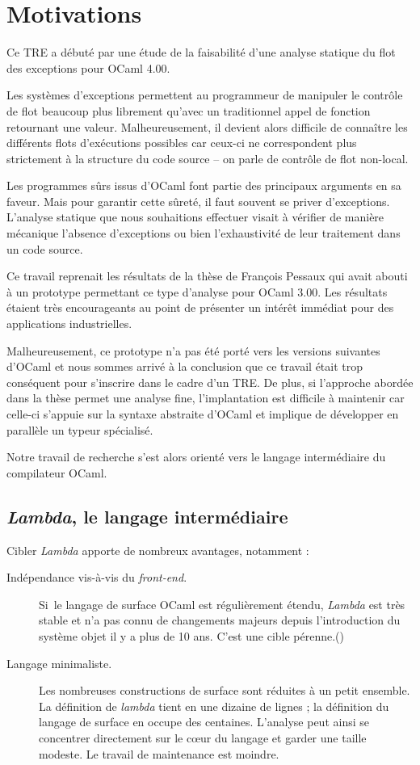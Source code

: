 \chapter{Motivations}

Ce TRE a débuté par une étude de la faisabilité d'une analyse statique du
flot des exceptions pour OCaml 4.00. 

Les systèmes d'exceptions permettent au programmeur de manipuler le contrôle de
flot beaucoup plus librement qu'avec un traditionnel appel de fonction
retournant une valeur. Malheureusement, il devient alors difficile de connaître
les différents flots d'exécutions possibles car ceux-ci ne correspondent plus
strictement à la structure du code source -- on parle de contrôle de flot
non-local.

Les programmes sûrs issus d'OCaml font partie des principaux arguments en sa
faveur. Mais pour garantir cette sûreté, il faut souvent se priver
d'exceptions.  L'analyse statique que nous souhaitions effectuer visait à
vérifier de manière mécanique l'absence d'exceptions ou bien l'exhaustivité de
leur traitement dans un code source.

Ce travail reprenait les résultats de la thèse de François Pessaux
\cite{ExcAnalysis} qui avait abouti à un prototype permettant ce type d'analyse
pour OCaml 3.00.  Les résultats étaient très encourageants au point de
présenter un intérêt immédiat pour des applications industrielles.

Malheureusement, ce prototype n'a pas été porté vers les versions suivantes
d'OCaml et nous sommes arrivé à la conclusion que ce travail était trop
conséquent pour s'inscrire dans le cadre d'un TRE.  De plus, si l'approche
abordée dans la thèse permet une analyse fine, l'implantation est difficile à
maintenir car celle-ci s'appuie sur la syntaxe abstraite d'OCaml et implique de
développer en parallèle un typeur spécialisé.

Notre travail de recherche s'est alors orienté vers le langage intermédiaire du
compilateur OCaml. 

\section{\emph{Lambda}, le langage intermédiaire}

Cibler \emph{Lambda} apporte de nombreux avantages, notamment :
\begin{description}
  \item[Indépendance vis-à-vis du \emph{front-end}.] Si le langage de surface
    OCaml est régulièrement étendu, \emph{Lambda} est très stable et n'a pas
    connu de changements majeurs depuis l'introduction du système objet il y a
    plus de 10 ans. C'est une cible pérenne.()
  \item[Langage minimaliste.]
    Les nombreuses constructions de surface sont réduites à un petit ensemble.
		La définition de \emph{lambda} tient en une dizaine de lignes ;
		la définition du langage de surface en occupe des centaines.
    L'analyse peut ainsi se concentrer directement sur le cœur du langage et
    garder une taille modeste. Le travail de maintenance est moindre.
\end{description}

